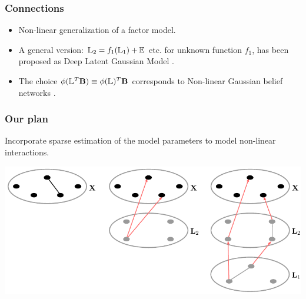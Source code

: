 \documentclass[10pt]{beamer}
\theoremstyle{definition}
\begin{document}
\begin{frame}
\frametitle{Connections}

\begin{itemize}
\item Non-linear generalization of a factor model.

\vspace{1em}
\item A general version: ${\mathbb{L}}_2 = f_1({\mathbb{L}}_1) + {\mathbb{E}}$ etc. for unknown function $f_1$, has been proposed as Deep Latent Gaussian Model \citep{RezendeEtal14}.

\vspace{1em}
\item The choice $\phi({\mathbb{L}}^T {\mathbf{B}}) \equiv \phi({\mathbb{L}})^T {\mathbf{B}}$ corresponds to Non-linear Gaussian belief networks \citep{FreyHinton99}.

\end{itemize}
\end{frame}

\begin{frame}
\frametitle{Our plan}

Incorporate {\colbit sparse} estimation of the model parameters to model non-linear interactions.

\begin{center}
\includegraphics[width=.7\textwidth]{latentinteractions}
\end{center}

\end{frame}
\end{document}
